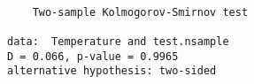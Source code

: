 \begin{verbatim} 

	Two-sample Kolmogorov-Smirnov test

data:  Temperature and test.nsample
D = 0.066, p-value = 0.9965
alternative hypothesis: two-sided

\end{verbatim}
